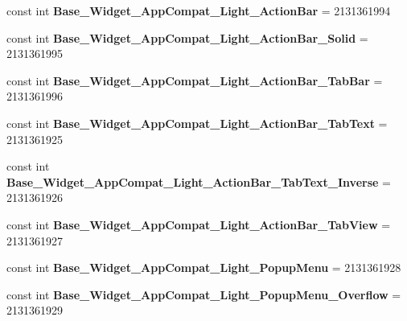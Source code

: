\begin{DoxyCompactItemize}
const int {\bfseries Base\+\_\+\+Widget\+\_\+\+App\+Compat\+\_\+\+Light\+\_\+\+Action\+Bar} = 2131361994
\item 
\mbox{\label{class_pinned_app_1_1_droid_1_1_resource_1_1_style_abd2b6e9c09d9e64b5f3e8ccdf025b984}} 
const int {\bfseries Base\+\_\+\+Widget\+\_\+\+App\+Compat\+\_\+\+Light\+\_\+\+Action\+Bar\+\_\+\+Solid} = 2131361995
\item 
\mbox{\label{class_pinned_app_1_1_droid_1_1_resource_1_1_style_a74c07c30b3ee3839b70522852067cbd0}} 
const int {\bfseries Base\+\_\+\+Widget\+\_\+\+App\+Compat\+\_\+\+Light\+\_\+\+Action\+Bar\+\_\+\+Tab\+Bar} = 2131361996
\item 
\mbox{\label{class_pinned_app_1_1_droid_1_1_resource_1_1_style_a88f4ddefb7f77fb34ca787d3eb9b9890}} 
const int {\bfseries Base\+\_\+\+Widget\+\_\+\+App\+Compat\+\_\+\+Light\+\_\+\+Action\+Bar\+\_\+\+Tab\+Text} = 2131361925
\item 
\mbox{\label{class_pinned_app_1_1_droid_1_1_resource_1_1_style_a121461c7ca9120144d71c19cbe714aa6}} 
const int {\bfseries Base\+\_\+\+Widget\+\_\+\+App\+Compat\+\_\+\+Light\+\_\+\+Action\+Bar\+\_\+\+Tab\+Text\+\_\+\+Inverse} = 2131361926
\item 
\mbox{\label{class_pinned_app_1_1_droid_1_1_resource_1_1_style_a54e65df6e1c1b68e1bec2ac30ff68893}} 
const int {\bfseries Base\+\_\+\+Widget\+\_\+\+App\+Compat\+\_\+\+Light\+\_\+\+Action\+Bar\+\_\+\+Tab\+View} = 2131361927
\item 
\mbox{\label{class_pinned_app_1_1_droid_1_1_resource_1_1_style_a92107d00623e5bf5284e2ed7f9bf7ade}} 
const int {\bfseries Base\+\_\+\+Widget\+\_\+\+App\+Compat\+\_\+\+Light\+\_\+\+Popup\+Menu} = 2131361928
\item 
\mbox{\label{class_pinned_app_1_1_droid_1_1_resource_1_1_style_a9ae4bea79feed2f393c800c36ad25990}} 
const int {\bfseries Base\+\_\+\+Widget\+\_\+\+App\+Compat\+\_\+\+Light\+\_\+\+Popup\+Menu\+\_\+\+Overflow} = 2131361929

\end{DoxyCompactItemize}
